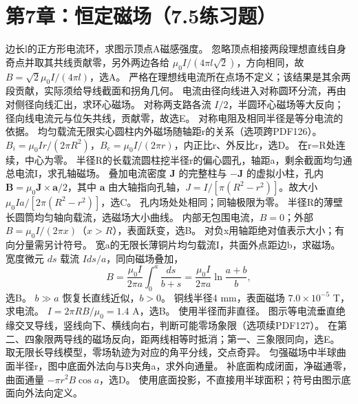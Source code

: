 \section{第7章：恒定磁场（7.5练习题）}
\problemtext 边长l的正方形电流环，求图示顶点A磁感强度。
\workings 忽略顶点相接两段理想直线自身奇点并取其共线贡献零，另外两边各给 $\mu_0I/(4\pi l\sqrt2)$，方向相同，故 $B=\sqrt2\mu_0I/(4\pi l)$，选A。
\crosscheck 严格在理想线电流所在点场不定义；该结果是其余两段贡献，实际须给导线截面和拐角几何。
\problemtext 电流由径向线进入对称圆环分流，再由对侧径向线汇出，求环心磁场。
\workings 对称两支路各流 $I/2$，半圆环心磁场等大反向；径向线电流元与位矢共线，贡献零，故选E。
\crosscheck 对称电阻及相同半径是等分电流的依据。
\problemtext 均匀载流无限实心圆柱内外磁场随轴距r的关系（选项跨PDF126）。
\workings $B_i=\mu_0Ir/(2\pi R^2)$，$B_e=\mu_0I/(2\pi r)$，内正比r、外反比r，选D。
\crosscheck 在r=R处连续，中心为零。
\problemtext 半径R的长载流圆柱挖半径r的偏心圆孔，轴距a，剩余截面均匀通总电流I，求孔轴磁场。
\workings 叠加电流密度 $\bm J$ 的完整柱与 $-\bm J$ 的虚拟小柱，孔内 $\bm B=\mu_0\bm J\times\bm a/2$，其中 $\bm a$ 由大轴指向孔轴，$J=I/[\pi(R^2-r^2)]$。故大小 $\mu_0Ia/[2\pi(R^2-r^2)]$，选C。
\crosscheck 孔内场处处相同；同轴极限为零。
\problemtext 半径R的薄壁长圆筒均匀轴向载流，选磁场大小曲线。
\workings 内部无包围电流，$B=0$；外部 $B=\mu_0I/(2\pi x)$（$x>R$），表面跃变，选B。
\crosscheck 对负x用轴距绝对值表示大小；有向分量需另计符号。
\problemtext 宽a的无限长薄铜片均匀载流I，共面外点距边b，求磁场。
\workings 宽度微元 $ds$ 载流 $I ds/a$，同向磁场叠加，
\[
B=\frac{\mu_0I}{2\pi a}\int_0^a\frac{ds}{b+s}=\frac{\mu_0I}{2\pi a}\ln\frac{a+b}{b},
\]
选B。
\crosscheck $b\gg a$ 恢复长直线近似，$b>0$。
\problemtext 铜线半径4 mm，表面磁场 $7.0\times10^{-5}$ T，求电流。
\workings $I=2\pi RB/\mu_0=1.4$ A，选B。
\crosscheck 使用半径而非直径。
\problemtext 图示等电流垂直绝缘交叉导线，竖线向下、横线向右，判断可能零场象限（选项续PDF127）。
\workings 在第二、四象限两导线的磁场反向，距两线相等时抵消；第一、三象限同向，选E。
\crosscheck 取无限长导线模型，零场轨迹为对应的角平分线，交点奇异。
\problemtext 匀强磁场中半球曲面半径r，图中底面外法向与B夹角a，求外向通量。
\workings 补底面构成闭面，净磁通零，曲面通量 $-\pi r^2B\cos a$，选D。
\crosscheck 使用底面投影，不直接用半球面积；符号由图示底面向外法向定义。
